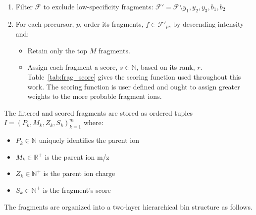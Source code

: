 \documentclass[pdflatex,sn-nature]{sn-jnl}
\begin{document}
\begin{enumerate}
\item Filter $\mathcal{F}$ to exclude low-specificity fragments: $\mathcal{F}' = \mathcal{F} \setminus {y_1, y_2, y_3, b_1, b_2}$
\item For each precursor, $p$, order its fragments, $f \in \mathcal{F}'_p$, by descending intensity and:
    \begin{itemize}
        \item Retain only the top $M$ fragments.
        \item Assign each fragment a score, $s \in \mathbb{N}$, based on its rank, $r$. Table~\ref{tab:frag_score} gives the scoring function used throughout this work. The scoring function is user defined and ought to assign greater weights to the more probable fragment ions. 
    \end{itemize}
\end{enumerate}

The filtered and scored fragments are stored as ordered tuples $I = {(P_k, M_k, Z_k, S_k)}_{k=1}^m$ where:

\begin{itemize}
\item $P_k \in \mathbb{N}$ uniquely identifies the parent ion
\item $M_k \in \mathbb{R}^+$ is the parent ion m/z
\item $Z_k \in  \mathbb{N}^+$ is the parent ion charge
\item $S_k \in \mathbb{N}^+$ is the fragment's score
\end{itemize}

The fragments are organized into a two-layer hierarchical bin structure as follows.
\end{document}
